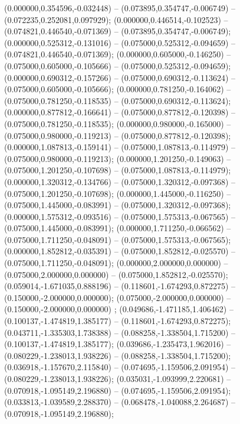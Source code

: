  (0.000000,0.354596,-0.032448) -- (0.073895,0.354747,-0.006749) -- (0.072235,0.252081,0.097929);
 (0.000000,0.446514,-0.102523) -- (0.074821,0.446540,-0.071369) -- (0.073895,0.354747,-0.006749);
 (0.000000,0.525312,-0.131016) -- (0.075000,0.525312,-0.094659) -- (0.074821,0.446540,-0.071369);
 (0.000000,0.605000,-0.146250) -- (0.075000,0.605000,-0.105666) -- (0.075000,0.525312,-0.094659);
 (0.000000,0.690312,-0.157266) -- (0.075000,0.690312,-0.113624) -- (0.075000,0.605000,-0.105666);
 (0.000000,0.781250,-0.164062) -- (0.075000,0.781250,-0.118535) -- (0.075000,0.690312,-0.113624);
 (0.000000,0.877812,-0.166641) -- (0.075000,0.877812,-0.120398) -- (0.075000,0.781250,-0.118535);
 (0.000000,0.980000,-0.165000) -- (0.075000,0.980000,-0.119213) -- (0.075000,0.877812,-0.120398);
 (0.000000,1.087813,-0.159141) -- (0.075000,1.087813,-0.114979) -- (0.075000,0.980000,-0.119213);
 (0.000000,1.201250,-0.149063) -- (0.075000,1.201250,-0.107698) -- (0.075000,1.087813,-0.114979);
 (0.000000,1.320312,-0.134766) -- (0.075000,1.320312,-0.097368) -- (0.075000,1.201250,-0.107698);
 (0.000000,1.445000,-0.116250) -- (0.075000,1.445000,-0.083991) -- (0.075000,1.320312,-0.097368);
 (0.000000,1.575312,-0.093516) -- (0.075000,1.575313,-0.067565) -- (0.075000,1.445000,-0.083991);
 (0.000000,1.711250,-0.066562) -- (0.075000,1.711250,-0.048091) -- (0.075000,1.575313,-0.067565);
 (0.000000,1.852812,-0.035391) -- (0.075000,1.852812,-0.025570) -- (0.075000,1.711250,-0.048091);
 (0.000000,2.000000,0.000000) -- (0.075000,2.000000,0.000000) -- (0.075000,1.852812,-0.025570);
 (0.059014,-1.671035,0.888196) -- (0.118601,-1.674293,0.872275) -- (0.150000,-2.000000,0.000000);
 (0.075000,-2.000000,0.000000) -- (0.150000,-2.000000,0.000000) ;
 (0.049686,-1.471185,1.406462) -- (0.100137,-1.474819,1.385177) -- (0.118601,-1.674293,0.872275);
 (0.043711,-1.335303,1.738388) -- (0.088258,-1.338504,1.715200) -- (0.100137,-1.474819,1.385177);
 (0.039686,-1.235473,1.962016) -- (0.080229,-1.238013,1.938226) -- (0.088258,-1.338504,1.715200);
 (0.036918,-1.157670,2.115840) -- (0.074695,-1.159506,2.091954) -- (0.080229,-1.238013,1.938226);
 (0.035031,-1.093999,2.220681) -- (0.070918,-1.095149,2.196880) -- (0.074695,-1.159506,2.091954);
 (0.033813,-1.039589,2.288370) -- (0.068478,-1.040088,2.264687) -- (0.070918,-1.095149,2.196880);
